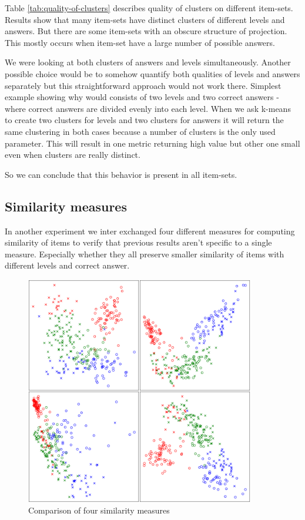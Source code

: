 \documentclass[
  digital, %
  table,   %
  nolof,     %
  nolot,     %
  nocover
]{fithesis3}
\begin{document}
Table \ref{tab:quality-of-clusters} describes quality of clusters on different item-sets. Results show that many item-sets have distinct clusters of different levels and answers. But there are some item-sets with an obscure structure of projection. This mostly occurs when item-set have a large number of possible answers.


We were looking at both clusters of answers and levels simultaneously. Another possible choice would be to somehow quantify both qualities of levels and answers separately but this straightforward approach would not work there. Simplest example showing why would consists of two levels and two correct answers - where correct answers are divided evenly into each level. When we ask k-means to create two clusters for levels and two clusters for answers it will return the same clustering in both cases because a number of clusters is the only used parameter. This will result in one metric returning high value but other one small even when clusters are really distinct.


So we can conclude that this behavior is present in all item-sets.


\subsection{Similarity measures}\label{similarity-measures}

In another experiment we inter exchanged four different measures for computing similarity of items to verify that previous results aren't specific to a single measure. Especially whether they all preserve smaller similarity of items with different levels and correct answer.

\begin{figure}
  \includegraphics[width=10cm]{img/measures}
  \caption{Comparison of four similarity measures}
  \label{fig:measures}
\end{figure}
\end{document}
